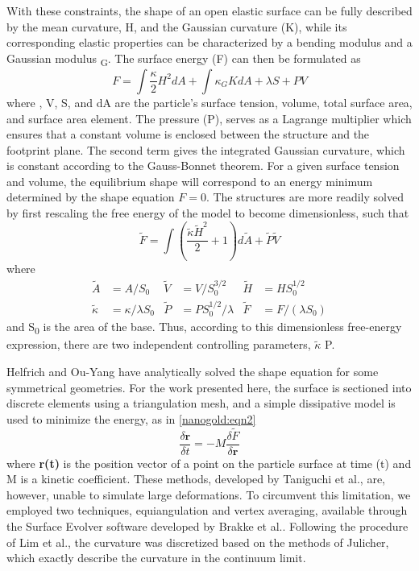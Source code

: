 With these constraints, the shape of an open elastic surface can be fully described by the mean curvature, H, and the Gaussian curvature (K), while its corresponding elastic properties can be characterized by a bending modulus \textkappa and a Gaussian modulus \textkappa\textsubscript{G}.
The surface energy (F) can then be formulated as
\begin{equation}
 F = \int \frac{\kappa}{2}H^2 dA + \int \kappa_G K dA + \lambda S + PV \label{nanogold:eqn1}
\end{equation}
where \textlambda, V, S, and dA are the particle's surface tension, volume, total surface area, and surface area element\cite{RefWorks:49,RefWorks:97}.
The pressure (P), serves as a Lagrange multiplier which ensures that a constant volume is enclosed between the structure and the footprint plane.
The second term gives the integrated Gaussian curvature, which is constant according to the Gauss-Bonnet theorem\cite{RefWorks:98}.
For a given surface tension and volume, the equilibrium shape will correspond to an energy minimum determined by the shape equation \textdelta{} \(F = 0\).
The structures are more readily solved by first rescaling the free energy of the model to become dimensionless, such that
\begin{equation}
 \tilde{F} = \int \left (\frac{\tilde{\kappa} \tilde{H}^2}{2} + 1 \right)d \tilde{A} + \tilde{P} \tilde{V} \label{nanogold:eqn2}
\end{equation}
where
\begin{align*}
 \tilde{A} &%
 = A/S_0 & \tilde{V} &%
 = V/S^{3/2}_0 &
 \tilde{H} &%
 = H S^{1/2}_0 \\
 \tilde{\kappa} &%
 = \kappa / \lambda S_0 &
 \tilde{P} &%
 = P S^{1/2}_0 / \lambda &
 \tilde{F} &%
 = F / (\lambda S_0)
\end{align*}
and S\textsubscript{0} is the area of the base.
Thus, according to this dimensionless free-energy expression, there are two independent controlling parameters, \(\tilde{\kappa}\) P.

Helfrich and Ou-Yang\cite{RefWorks:49} have analytically solved the shape equation for some symmetrical geometries.
For the work presented here, the surface is sectioned into discrete elements using a triangulation mesh, and a simple dissipative model is used to minimize the energy, as in \cref{nanogold:eqn2}\cite{RefWorks:76}
\begin{equation}
 \frac{\delta \mathbf{r}}{\delta t} = - M \frac{\delta \tilde{F}}{\delta \mathbf{r}} \label{nanogold:eqn3}
\end{equation}
where \textbf{r(t)} is the position vector of a point on the particle surface at time (t) and M is a kinetic coefficient.
These methods, developed by Taniguchi et al.\cite{RefWorks:76}, are, however, unable to simulate large deformations.
To circumvent this limitation, we employed two techniques, equiangulation and vertex averaging, available through the Surface Evolver software developed by Brakke et al.\cite{RefWorks:62}. Following the procedure of Lim et al.,\cite{RefWorks:99,RefWorks:100,RefWorks:101} the curvature was discretized based on the methods of Julicher\cite{RefWorks:52}, which exactly describe the curvature in the continuum limit.

